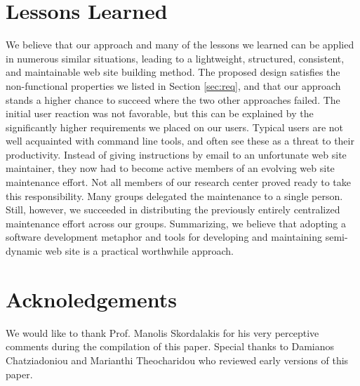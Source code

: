 \documentclass[10pt]{article}
\begin{document}
\section{Lessons Learned}
\label{sec:concl}
We believe that our approach and many of the lessons we learned
can be applied in numerous similar situations,
leading to a lightweight, structured, consistent, and maintainable
web site building method. The proposed design satisfies the non-functional properties
we listed in Section \ref{sec:req},
and that our approach stands a higher chance to succeed where the
two other approaches failed.
The initial user reaction was not favorable, but this can
be explained by the significantly higher requirements we
placed on our users. Typical users are not well acquainted
with command line tools, and often see these as a threat to their productivity.
Instead of giving instructions by email to an unfortunate
web site maintainer, they now had to become active members
of an evolving web site maintenance effort.
Not all members of our research center proved ready to take
this responsibility.
Many groups delegated the maintenance to a single person.
Still, however, we succeeded in distributing the previously
entirely centralized maintenance effort across our groups.
Summarizing, we believe that adopting a software development
metaphor and tools for developing and maintaining semi-dynamic
web site is a practical worthwhile approach.

\section{Acknoledgements}
\label{sec:ack}

We would like to thank Prof. Manolis Skordalakis for his very perceptive comments during the compilation of this paper.
Special thanks to Damianos Chatziadoniou and Marianthi Theocharidou who reviewed early versions of this paper.



\end{document}
